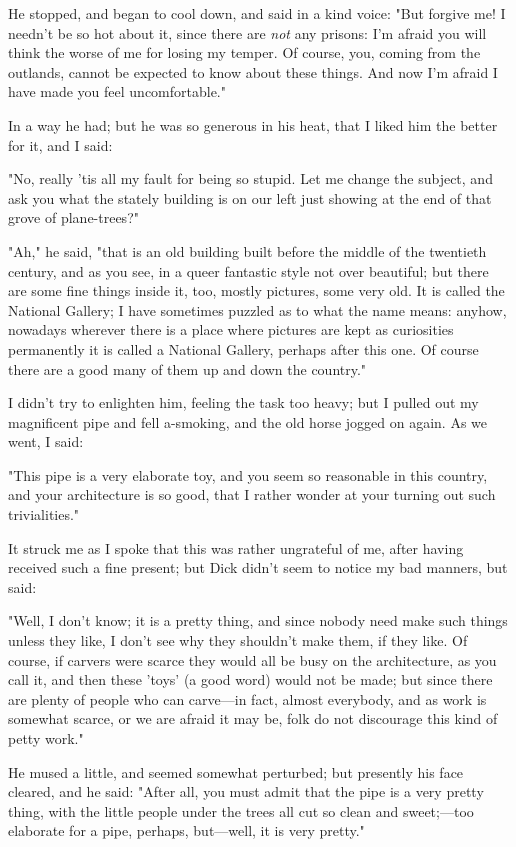 He stopped, and began to cool down, and said in a kind voice: "But
forgive me! I needn't be so hot about it, since there are \emph{not} any
prisons: I'm afraid you will think the worse of me for losing my temper.
Of course, you, coming from the outlands, cannot be expected to know
about these things. And now I'm afraid I have made you feel
uncomfortable."

In a way he had; but he was so generous in his heat, that I liked him
the better for it, and I said:

"No, really 'tis all my fault for being so stupid. Let me change the
subject, and ask you what the stately building is on our left just
showing at the end of that grove of plane-trees?"

"Ah," he said, "that is an old building built before the middle of the
twentieth century, and as you see, in a queer fantastic style not over
beautiful; but there are some fine things inside it, too, mostly
pictures, some very old. It is called the National Gallery; I have
sometimes puzzled as to what the name means: anyhow, nowadays wherever
there is a place where pictures are kept as curiosities permanently it
is called a National Gallery, perhaps after this one. Of course there
are a good many of them up and down the country."

I didn't try to enlighten him, feeling the task too heavy; but I pulled
out my magnificent pipe and fell a-smoking, and the old horse jogged on
again. As we went, I said:

"This pipe is a very elaborate toy, and you seem so reasonable in this
country, and your architecture is so good, that I rather wonder at your
turning out such trivialities."

It struck me as I spoke that this was rather ungrateful of me, after
having received such a fine present; but Dick didn't seem to notice my
bad manners, but said:

"Well, I don't know; it is a pretty thing, and since nobody need make
such things unless they like, I don't see why they shouldn't make them,
if they like. Of course, if carvers were scarce they would all be busy
on the architecture, as you call it, and then these 'toys' (a good word)
would not be made; but since there are plenty of people who can
carve---in fact, almost everybody, and as work is somewhat scarce, or we
are afraid it may be, folk do not discourage this kind of petty work."

He mused a little, and seemed somewhat perturbed; but presently his face
cleared, and he said: "After all, you must admit that the pipe is a very
pretty thing, with the little people under the trees all cut so clean
and sweet;---too elaborate for a pipe, perhaps, but---well, it is very
pretty."

